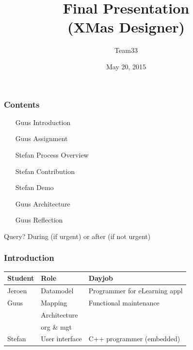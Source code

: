\documentclass[11pt]{beamer}
\author{Team33}
\title{Final Presentation\\(XMas Designer)}
\institute{Open University/\\Guus Bonnema, Stefan Versluys, Jeroen Kleijn}
\date{May 20, 2015}
\begin{document}
\newcommand{\Noc}{\textsc{NoC}\xspace}
\newcommand{\qt}{\textsc{Qt}\xspace}
\newcommand{\qml}{\textsc{Qml}\xspace}
\newcommand{\ou}{\textsc{Ou}\xspace}
\newcommand{\dad}{\textsc{Dad}\xspace}

\begin{frame}
	\titlepage
\end{frame}

\begin{frame}
	\frametitle{Contents}
	\begin{itemize}
		\item [Guus] Introduction 
		\item [Guus] Assignment
		\item [Stefan] Process Overview
		\item [Stefan] Contribution
		\item [Stefan] Demo
		\item [Guus] Architecture
		\item [Guus] Reflection
	\end{itemize}
	
	Query? During (if urgent) or after (if not urgent)
	
\end{frame}

\begin{frame}
	\frametitle{Introduction}
	\begin{tabular}{lp{2.5cm}p{4cm}}
	\hline
	{\bf Student} & {\bf Role}      & {\bf Dayjob}\\\hline
	Jeroen        &  Datamodel      & Programmer for eLearning appl\\
	Guus		  &  Mapping        & Functional maintenance\\
	              &  Architecture   &                       \\
	              &  org \& mgt     & \\
	Stefan        &  User interface & C++ programmer (embedded)\\
	\hline
	\end{tabular}
\end{frame}
\end{document}
